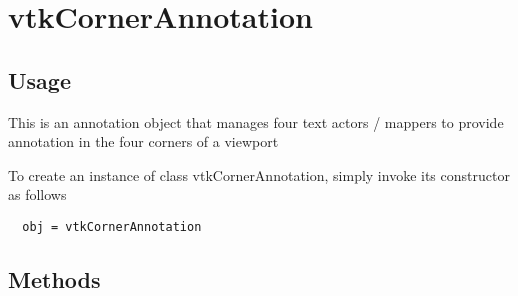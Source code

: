 \section{vtkCornerAnnotation}

\subsection{Usage}

 This is an annotation object that manages four text actors / mappers
 to provide annotation in the four corners of a viewport


To create an instance of class vtkCornerAnnotation, simply
invoke its constructor as follows
\begin{verbatim}
  obj = vtkCornerAnnotation
\end{verbatim}
\subsection{Methods}

